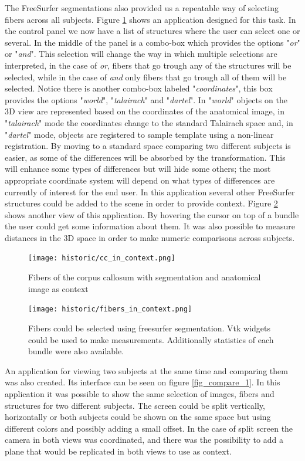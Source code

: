 The FreeSurfer segmentations also provided us a repeatable way of selecting fibers across all subjects. Figure \ref{fig_cc_ctx_1} shows an application designed for this task. In the control panel we now have a list of structures where the user can select one or several. In the middle of the panel is a combo-box which provides the options "\emph{or}" or "\emph{and}". This selection will change the way in which multiple selections are interpreted, in the case of \emph{or}, fibers that go trough any of the structures will be selected, while in the case of \emph{and} only fibers that go trough all of them will be selected. Notice there is another combo-box labeled "\emph{coordinates}", this box provides the options "\emph{world}", "\emph{talairach}" and "\emph{dartel}". In "\emph{world}" objects on the 3D view are represented based on the coordinates of the anatomical image, in "\emph{talairach}" mode the coordinates change to the standard Talairach space and, in "\emph{dartel}" mode, objects are registered to sample template using a non-linear registration. By moving to a standard space comparing two different subjects is easier, as some of the differences will be absorbed by the transformation. This will enhance some types of differences but will hide some others; the most appropriate coordinate system will depend on what types of differences are currently of interest for the end user. In this application several other FreeSurfer structures could be added to the scene in order to provide context. Figure \ref{fig_fibers_ctx} shows another view of this application. By hovering the cursor on top of a bundle the user could get some information about them. It was also possible to measure distances in the 3D space in order to make numeric comparisons across subjects.

\begin{figure}
\centering
\texttt{[image: historic/cc\_in\_context.png]} 
\caption{\label{fig_cc_ctx_1}Fibers of the corpus callosum with segmentation and anatomical image as context}
\end{figure}

\begin{figure}
\centering
\texttt{[image: historic/fibers\_in\_context.png]} 
\caption{\label{fig_fibers_ctx}Fibers could be selected using freesurfer segmentation. Vtk widgets could be used to make measurements.
Additionally statistics of each bundle were also available.}
\end{figure}

An application for viewing two subjects at the same time and comparing them was also created. Its interface can be seen on figure \ref{fig_compare_1}. In this application it was possible to show the same selection of images, fibers and structures for two different subjects. The screen could be split vertically, horizontally or both subjects could be shown on the same space but using different colors and possibly adding a small offset. In the case of split screen the camera in both views was coordinated, and there was the possibility to add a plane that would be replicated in both views to use as context.

